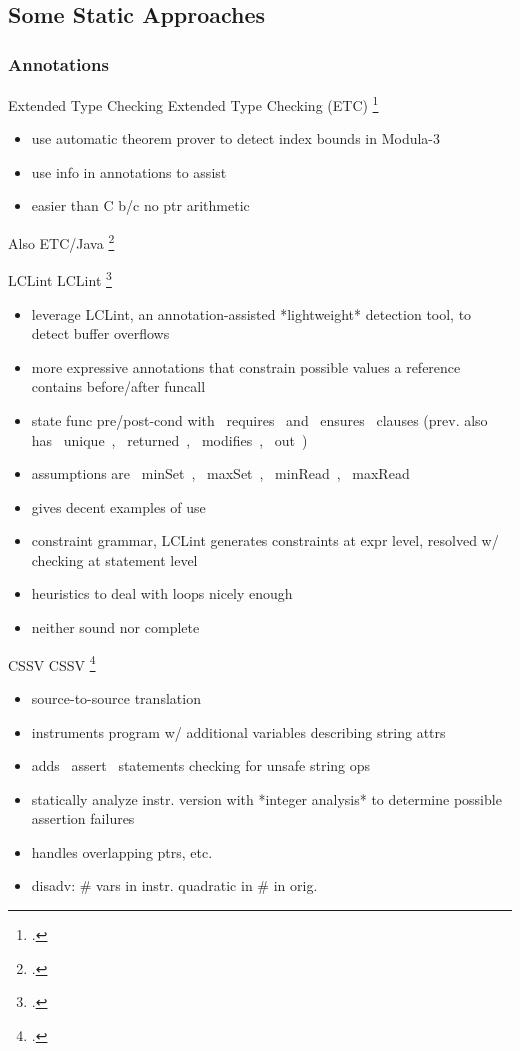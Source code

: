 \documentclass[aspectratio=169]{beamer}
\begin{document}
\subsection{Some Static Approaches}

\subsubsection{Annotations}

\begin{frame}[fragile]{Extended Type Checking}
Extended Type Checking (ETC) \footcite{detlefs_overview_1995}
    \begin{itemize}
      \item use automatic theorem prover to detect index bounds in Modula-3
      \item use info in annotations to assist
      \item easier than C b/c no ptr arithmetic
    \end{itemize}
Also ETC/Java \footcite{flanagan_extended_2002}
\end{frame}

\begin{frame}[fragile]{LCLint}
LCLint \footcite{larochelle_statically_2001}
\begin{itemize}
    \item leverage LCLint, an annotation-assisted *lightweight* detection tool, to detect buffer overflows
    \item more expressive annotations that constrain possible values a reference contains before/after funcall
    \item state func pre/post-cond with ~requires~ and ~ensures~ clauses (prev. also has ~unique~, ~returned~, ~modifies~, ~out~)
    \item assumptions are ~minSet~, ~maxSet~, ~minRead~, ~maxRead~
    \item gives decent examples of use
    \item constraint grammar, LCLint generates constraints at expr level, resolved w/ checking at statement level
    \item heuristics to deal with loops nicely enough
    \item neither sound nor complete
\end{itemize}
\end{frame}

\begin{frame}[fragile]{CSSV}
CSSV \footcite{dor_cssv:_2003}
\begin{itemize}
    \item source-to-source translation
    \item instruments program w/ additional variables describing string attrs
    \item adds ~assert~ statements checking for unsafe string ops
    \item statically analyze instr. version with *integer analysis* to determine possible assertion failures
    \item handles overlapping ptrs, etc.
    \item  disadv: \# vars in instr. quadratic in \# in orig.
\end{itemize}
\end{frame}
\end{document}
